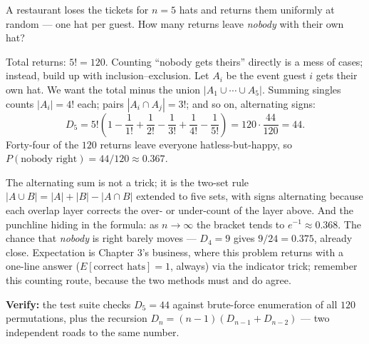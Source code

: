 \begin{worked}\label{wk:derangements}
A restaurant loses the tickets for $n = 5$ hats and returns them uniformly at random --- one hat per guest. How many returns leave \emph{nobody} with their own hat?

Total returns: $5! = 120$. Counting ``nobody gets theirs'' directly is a mess of cases; instead, build up with inclusion--exclusion. Let $A_i$ be the event guest $i$ gets their own hat. We want the total minus the union $|A_1 \cup \cdots \cup A_5|$. Summing singles counts $|A_i| = 4!$ each; pairs $|A_i \cap A_j| = 3!$; and so on, alternating signs:
\[
D_5 = 5! \left(1 - \frac{1}{1!} + \frac{1}{2!} - \frac{1}{3!} + \frac{1}{4!} - \frac{1}{5!}\right)
= 120 \cdot \frac{44}{120} = 44.
\]
Forty-four of the $120$ returns leave everyone hatless-but-happy, so $P(\text{nobody right}) = 44/120 \approx 0.367$.

The alternating sum is not a trick; it is the two-set rule $|A \cup B| = |A|+|B|-|A \cap B|$ extended to five sets, with signs alternating because each overlap layer corrects the over- or under-count of the layer above. And the punchline hiding in the formula: as $n \to \infty$ the bracket tends to $e^{-1} \approx 0.368$. The chance that \emph{nobody} is right barely moves --- $D_4 = 9$ gives $9/24 = 0.375$, already close. Expectation is Chapter 3's business, where this problem returns with a one-line answer ($E[\text{correct hats}] = 1$, always) via the indicator trick; remember this counting route, because the two methods must and do agree.

\textbf{Verify:} the test suite checks $D_5 = 44$ against brute-force enumeration of all $120$ permutations, plus the recursion $D_n = (n-1)(D_{n-1} + D_{n-2})$ --- two independent roads to the same number.
\end{worked}

